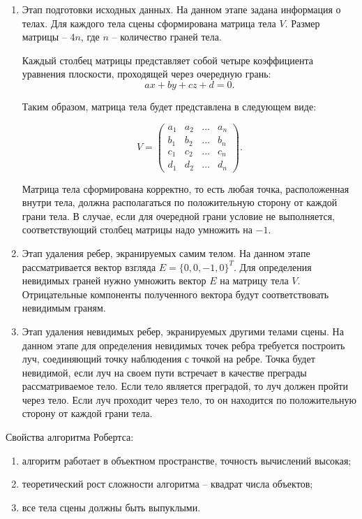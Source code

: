 \begin{enumerate}[label=\arabic*)]
	\item Этап подготовки исходных данных.
	На данном этапе задана информация о телах. Для каждого тела сцены сформирована матрица тела $V$. Размер матрицы -- $4n$, где $n$ -- количество граней тела.
	
	Каждый столбец матрицы представляет собой четыре коэффициента уравнения плоскости, проходящей через очередную грань:
	\begin{equation}
		\label{eqpolygone}
		ax + by + cz + d = 0.
	\end{equation}
	
	Таким образом, матрица тела будет представлена в следующем виде:
	
	\begin{equation}
		V = \begin{pmatrix}
			a_{1} & a_{2} & \ldots & a_{n}\\
			b_{1} & b_{2} & \ldots & b_{n}\\
			c_{1} & c_{2} & \ldots & c_{n}\\
			d_{1} & d_{2} & \ldots & d_{n}
		\end{pmatrix}.
	\end{equation}
	
	Матрица тела сформирована корректно, то есть любая точка, расположенная внутри тела, должна располагаться по положительную сторону от каждой грани тела. В случае, если для очередной грани условие не выполняется, соответствующий столбец матрицы надо умножить на $-1$. 
	
	\item Этап удаления ребер, экранируемых самим телом.
	На данном этапе рассматривается вектор взгляда $E = \{0, 0, -1, 0\}^T$.
	Для определения невидимых граней нужно умножить вектор $E$ на матрицу тела $V$. Отрицательные компоненты полученного вектора будут соответствовать невидимым граням.

	\item Этап удаления невидимых ребер, экранируемых другими телами сцены.
	На данном этапе для определения невидимых точек ребра требуется построить луч, соединяющий точку наблюдения с точкой на ребре. Точка будет невидимой, если луч на своем пути встречает в качестве преграды рассматриваемое тело. Если тело является преградой, то луч должен пройти через тело. Если луч проходит через тело, то он находится по положительную сторону от каждой грани тела.
\end{enumerate}

Свойства алгоритма Робертса:
\begin{enumerate}[label=\arabic*)]
	\item алгоритм работает в объектном пространстве, точность вычислений высокая;
	\item теоретический рост сложности алгоритма -- квадрат числа объектов;
	\item все тела сцены должны быть выпуклыми. 
\end{enumerate}

